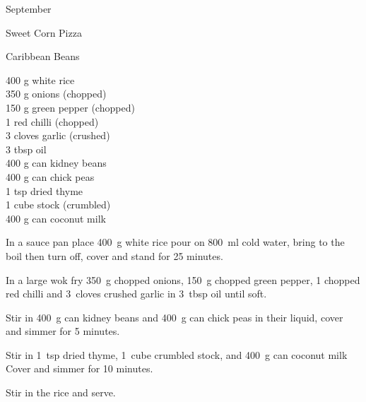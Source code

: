 \begin{menu}{September}
\begin{recipe}{2}{Sweet Corn Pizza}
\begin{instructions}
    \end{instructions}
    \end{recipe}%
  
    \begin{recipe}{2}{Caribbean Beans}%
		\begin{ingredients}
		400 g white rice  \\
	350 g onions (chopped) \\
	150 g green pepper (chopped) \\
	1  red chilli (chopped) \\
	3 cloves garlic (crushed) \\
	3 tbsp oil  \\
	400 g can kidney beans  \\
	400 g can chick peas  \\
	1 tsp dried thyme  \\
	1 cube stock (crumbled) \\
	400 g can coconut milk  \\
	
		\end{ingredients}
	
	
    \begin{instructions}
    \item 
    In a
    sauce pan
    place
    400~g  white rice
    pour on
    800~ml  cold water,
    bring to the boil then turn off, cover and stand for 25 minutes.
  \item 
        In a large wok fry
        350~g chopped onions,
        150~g chopped green pepper,
        1 chopped red chilli
        and
        3~cloves crushed garlic
        in
        3~tbsp  oil
        until soft.
      \item 
        Stir in
        400~g  can kidney beans
        and
        400~g  can chick peas
        in their liquid,
        cover and simmer for 5 minutes.
      \item 
        Stir in
        1~tsp  dried thyme,
        1~cube crumbled stock,
        and
        400~g  can coconut milk
        Cover and simmer for 10 minutes.
      \item 
        Stir in the rice and serve.
      
    \end{instructions}
    \end{recipe}%
  

\end{menu}
